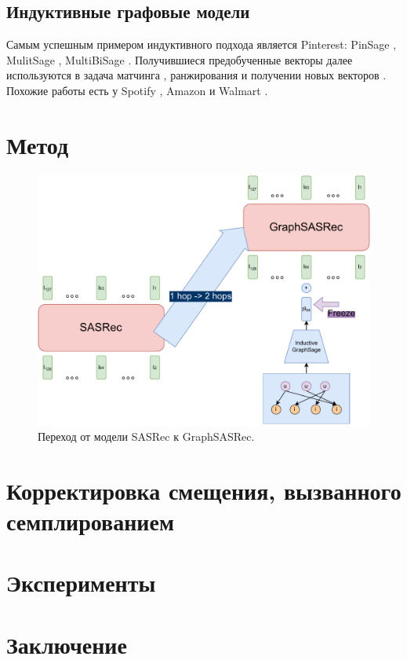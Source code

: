 \documentclass{article}
\begin{document}
\subsection{Индуктивные графовые модели}

Самым успешным примером индуктивного подхода является Pinterest: PinSage \cite{pinsage}, MulitSage \cite{multisage}, MultiBiSage \cite{multibisage}. Получившиеся 
предобученные векторы далее используются в задача матчинга \cite{pinnerformer}, ранжирования \cite{transact} и получении новых векторов \cite{itemsage}.
Похожие работы есть у Spotify \cite{podcastgnn}, Amazon \cite{amazonalexa} и Walmart \cite{walmart}.

\section{Метод}

\begin{figure}[!ht]
    \centering
    \includegraphics[width=130mm]{images/grpahsasrec2.pdf}
    \caption{Переход от модели SASRec к GraphSASRec.}
\end{figure}


\section{Корректировка смещения, вызванного семплированием}

\section{Эксперименты}

\section{Заключение}


 
\end{document}
